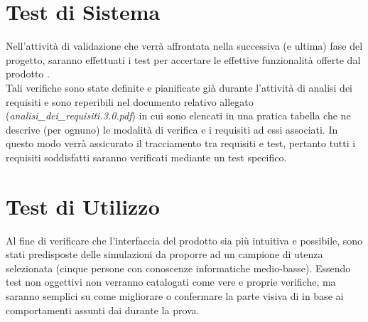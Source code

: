 \section{Test di Sistema}
Nell'attività di validazione che verrà affrontata nella successiva (e ultima) fase del progetto, saranno effettuati i test per accertare le effettive funzionalità offerte dal prodotto \caName.\\ Tali verifiche sono state definite e pianificate già durante l'attività di analisi dei requisiti e sono reperibili nel documento relativo allegato (\textit{analisi\_dei\_requisiti.3.0.pdf}) in cui sono elencati in una pratica tabella che ne descrive (per ognuno) le modalità di verifica e i requisiti ad essi associati. In questo modo verrà assicurato il tracciamento tra requisiti e test, pertanto tutti i requisiti soddisfatti saranno verificati mediante un test specifico.

\section{Test di Utilizzo}
Al fine di verificare che l'interfaccia del prodotto sia più intuitiva e  possibile, sono stati predisposte delle simulazioni da proporre ad un campione di utenza selezionata (cinque persone con conoscenze informatiche medio-basse).
Essendo test non oggettivi non verranno catalogati come vere e proprie verifiche, ma saranno semplici  su come migliorare o confermare la parte visiva di \caName in base ai comportamenti assunti dai  durante la prova.
